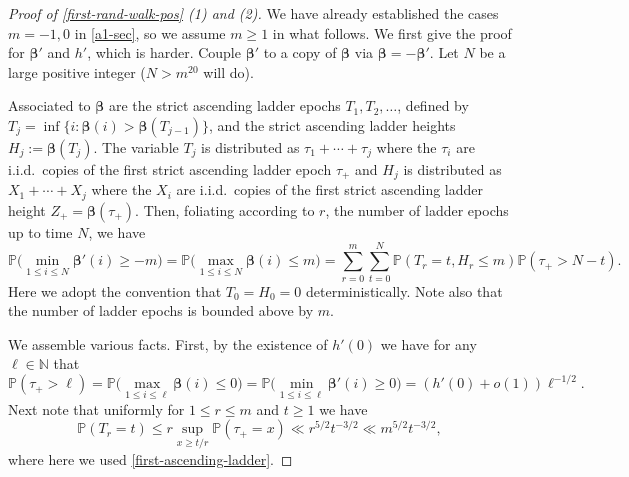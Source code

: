 \documentclass[11pt,reqno]{amsart}
\numberwithin{equation}{section}
\theoremstyle{definition}
\theoremstyle{remark}
\newcommand{\mb}{\mathbb}
\def\boldbeta{\boldsymbol\beta}
\renewcommand{\le}{\leqslant}
\renewcommand{\ge}{\geqslant}
\newcommand\N{\mathbb{N}}
\begin{document}
\begin{proof}[Proof of \cref{first-rand-walk-pos} (1) and (2)] We have already established the cases $m = -1,0$ in \cref{a1-sec}, so we assume $m \ge 1$ in what follows. We first give the proof for $\boldbeta'$ and $h'$, which is harder. Couple $\boldbeta'$ to a copy of $\boldbeta$ via $\boldbeta = - \boldbeta'$. Let $N$ be a large positive integer ($N > m^{20}$ will do). 

Associated to $\boldbeta$ are the strict ascending ladder epochs $T_1,T_2,\dots$, defined by $T_j = \inf\{ i : \boldbeta(i) > \boldbeta(T_{j-1})\}$, and the strict ascending ladder heights $H_j := \boldbeta(T_j)$. The variable $T_j$ is distributed as $\tau_1 + \cdots + \tau_j$ where the $\tau_i$ are i.i.d.\ copies of the first strict ascending ladder epoch $\tau_+$ and $H_j$ is distributed as $X_1 + \cdots + X_j$ where the $X_i$ are i.i.d.\ copies of the first strict ascending ladder height $Z_+ = \boldbeta(\tau_+)$. Then, foliating according to $r$, the number of ladder epochs up to time $N$, we have
\begin{equation}\label{min-minus-m} \mb{P}\big(\min_{1 \le i \le N} \boldbeta'(i) \ge -m\big) = \mb{P}\big(\max_{1 \le i \le N} \boldbeta(i) \le m\big)  = \sum_{r = 0}^m \sum_{t = 0}^N \mb{P}(T_r = t, H_r \le m) \mb{P}( \tau_+  > N - t).\end{equation} Here we adopt the convention that $T_0 = H_0 = 0$ deterministically. Note also that the number of ladder epochs is bounded above by $m$.

We assemble various facts. First, by the existence of $h'(0)$ we have for any $\ell \in \N$ that  
\begin{equation}\label{pos-prob} \mb{P}(\tau_+ > \ell) = \mb{P}\big(\max_{1 \le i \le \ell} \boldbeta(i) \le 0\big) = \mb{P}\big(\min_{1 \le i \le \ell} \boldbeta'(i) \ge 0\big) = (h'(0) + o(1)) \ell^{-1/2}.\end{equation}
Next note that uniformly for $1 \le r \le m$ and $t \ge 1$ we have
\begin{equation}\label{tk-pointwise} \mb{P}(T_r = t) \le r \sup_{x \ge t/r} \mb{P}(\tau_+ = x) \ll r^{5/2} t^{-3/2} \ll m^{5/2} t^{-3/2},\end{equation} where here we used \cref{first-ascending-ladder}. 


\end{proof}
\end{document}
